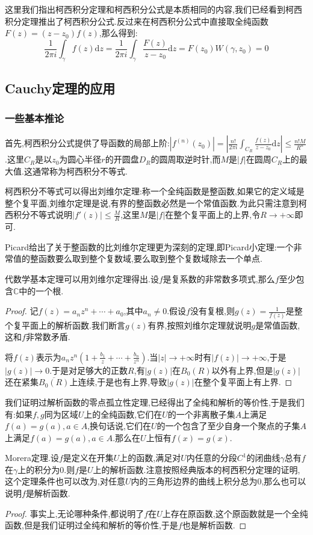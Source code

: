 这里我们指出柯西积分定理和柯西积分公式是本质相同的内容,我们已经看到柯西积分定理推出了柯西积分公式.反过来在柯西积分公式中直接取全纯函数$F(z)=(z-z_0)f(z)$,那么得到:
$$\frac{1}{2\pi i}\int_{\gamma}f(z)\mathrm{d}z=\frac{1}{2\pi i}\int_{\gamma}\frac{F(z)}{z-z_0}\mathrm{d}z=F(z_0)W(\gamma,z_0)=0$$
\newpage
\subsection{Cauchy定理的应用}
\subsubsection{一些基本推论}

首先,柯西积分公式提供了导函数的局部上阶:$|f^{(n)}(z_0)|=\left|\frac{n!}{2\pi i}\int_{C_R}\frac{f(z)}{z-z_0}\mathrm{d}z\right|\le\frac{n!M}{R^n}$.这里$C_R$是以$z_0$为圆心半径$r$的开圆盘$D_R$的圆周取逆时针,而$M$是$|f|$在圆周$C_R$上的最大值.这通常称为柯西积分不等式.

柯西积分不等式可以得出刘维尔定理:称一个全纯函数是整函数,如果它的定义域是整个复平面,刘维尔定理是说,有界的整函数必然是一个常值函数.为此只需注意到柯西积分不等式说明$|f'(z)|\le\frac{M}{R}$,这里$M$是$|f|$在整个复平面上的上界,令$R\to+\infty$即可.

Picard给出了关于整函数的比刘维尔定理更为深刻的定理,即Picard小定理:一个非常值的整函数要么取到整个复数域,要么取到整个复数域除去一个单点.

代数学基本定理可以用刘维尔定理得出.设$f$是复系数的非常数多项式,那么$f$至少包含$\mathbb{C}$中的一个根.
\begin{proof}
	
	记$f(z)=a_nz^n+\cdots+a_0$,其中$a_n\not=0$.假设$f$没有复根,则$g(z)=\frac{1}{f(z)}$是整个复平面上的解析函数.我们断言$g(z)$有界,按照刘维尔定理就说明$g$是常值函数,这和$f$非常数矛盾.
	
	将$f(z)$表示为$a_nz^n\left(1+\frac{b_1}{z}+\cdots+\frac{b_n}{z^n}\right)$.当$|z|\to+\infty$时有$|f(z)|\to+\infty$,于是$|g(z)|\to0$.于是对足够大的正数$R$,有$|g(z)|$在$B_0(R)$以外有上界,但是$|g(z)|$还在紧集$\overline{B_0(R)}$上连续,于是也有上界,导致$|g(z)|$在整个复平面上有上界.
\end{proof}

我们证明过解析函数的零点孤立性定理,已经得出了全纯和解析的等价性,于是我们有:如果$f,g$同为区域$U$上的全纯函数,它们在$U$的一个非离散子集$A$上满足$f(a)=g(a),a\in A$,换句话说,它们在$U$的一个包含了至少自身一个聚点的子集$A$上满足$f(a)=g(a),a\in A$.那么在$U$上恒有$f(x)=g(x)$.

Morera定理.设$f$是定义在开集$U$上的函数,满足对$U$内任意的分段$C^1$的闭曲线$\gamma$总有$f$在$\gamma$上的积分为0.则$f$是$U$上的解析函数.注意按照经典版本的柯西积分定理的证明,这个定理条件也可以改为,对任意$U$内的三角形边界的曲线上积分总为0,那么也可以说明$f$是解析函数.
\begin{proof}
	
	事实上,无论哪种条件,都说明了$f$在$U$上存在原函数,这个原函数就是一个全纯函数,但是我们证明过全纯和解析的等价性,于是$f$也是解析函数.
\end{proof}

